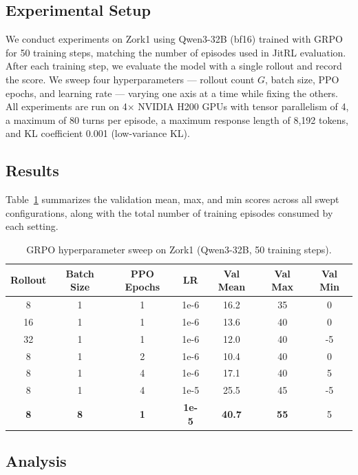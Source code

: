 \subsection{Experimental Setup}

We conduct experiments on Zork1 using Qwen3-32B (bf16) trained with GRPO for 50 training steps, matching the number of episodes used in JitRL evaluation. After each training step, we evaluate the model with a single rollout and record the score. We sweep four hyperparameters — rollout count $G$, batch size, PPO epochs, and learning rate — varying one axis at a time while fixing the others. All experiments are run on 4$\times$ NVIDIA H200 GPUs with tensor parallelism of 4, a maximum of 80 turns per episode, a maximum response length of 8,192 tokens, and KL coefficient 0.001 (low-variance KL).

\subsection{Results}

Table~\ref{tab:grpo_sweep} summarizes the validation mean, max, and min scores across all swept configurations, along with the total number of training episodes consumed by each setting.

\begin{table}[h]
\centering
\caption{GRPO hyperparameter sweep on Zork1 (Qwen3-32B, 50 training steps).}
\label{tab:grpo_sweep}
\vskip 0.1in
\begin{tabular}{ccccccc}
\toprule
\textbf{Rollout} & \textbf{Batch Size} & \textbf{PPO Epochs} & \textbf{LR} & \textbf{Val Mean} & \textbf{Val Max} & \textbf{Val Min} \\
\midrule
8  & 1 & 1 & 1e-6 & 16.2 & 35 & 0  \\
16 & 1 & 1 & 1e-6 & 13.6 & 40 & 0  \\
32 & 1 & 1 & 1e-6 & 12.0 & 40 & -5 \\
8  & 1 & 2 & 1e-6 & 10.4 & 40 & 0  \\
8  & 1 & 4 & 1e-6 & 17.1 & 40 & 5  \\
8  & 1 & 4 & 1e-5 & 25.5 & 45 & -5 \\
\textbf{8}  & \textbf{8} & \textbf{1} & \textbf{1e-5} & \textbf{40.7} & \textbf{55} & 5  \\
\bottomrule
\end{tabular}
\end{table}

\subsection{Analysis}

